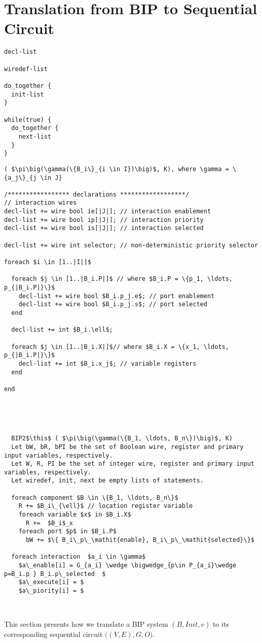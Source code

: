 \section{Translation from BIP to Sequential Circuit}
\label{sect-translation}



\begin{lstlisting}
decl-list

wiredef-list

do_together {
  init-list
}

while(true) {
  do_together {
    next-list
  }
}
\end{lstlisting}

\begin{lstlisting}
( $\pi\big(\gamma(\{B_i\}_{i \in I})\big)$, K), where \gamma = \{a_j\}_{j \in J}

/***************** declarations ******************/
// interaction wires
decl-list += wire bool ie[|J|]; // interaction enablement 
decl-list += wire bool ip[|J|]; // interaction priority
decl-list += wire bool is[|J|]; // interaction selected

decl-list += wire int selector; // non-deterministic priority selector

foreach $i \in [1..|I|]$

  foreach $j \in [1..|B_i.P|]$ // where $B_i.P = \{p_1, \ldots, p_{|B_i.P|}\}$ 
    decl-list += wire bool $B_i.p_j.e$; // port enablement
    decl-list += wire bool $B_i.p_j.s$; // port selected
  end 
  
  decl-list += int $B_i.\ell$;
  
  foreach $j \in [1..|B_i.X|]$// where $B_i.X = \{x_1, \ldots, p_{|B_i.P|}\}$  
    decl-list += int $B_i.x_j$; // variable registers
  end
   
end
    
   



\end{lstlisting}


\begin{lstlisting}
  BIP2$\this$ ( $\pi\big(\gamma(\{B_1, \ldots, B_n\})\big)$, K)
  Let bW, bR, bPI be the set of Boolean wire, register and primary input variables, respectively.
  Let W, R, PI be the set of integer wire, register and primary input variables, respectively.
  Let wiredef, init, next be empty lists of statements. 

  foreach component $B \in \{B_1, \ldots, B_n\}$
    R += $B_i\_{\ell}$ // location register variable
    foreach variable $x$ in $B_i.X$
      R +=  $B_i$_x
    foreach port $p$ in $B_i.P$ 
      bW += $\{ B_i\_p\_\mathit{enable}, B_i\_p\_\mathit{selected}\}$

  foreach interaction  $a_i \in \gamma$
    $a\_enable[i] = G_{a_i} \wedge \bigwedge_{p\in P_{a_i}\wedge p=B_i.p } B_i.p\_selected  $ 
    $a\_execute[i] = $
    $a\_piority[i] = $

      

\end{lstlisting}
This section presents how we translate a BIP system $(B,\mathit{Init}, v)$ to its corresponding sequential circuit  $\big( (V, E),G, O\big)$. 



